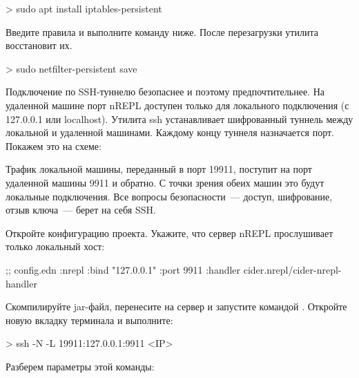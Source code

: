 \begin{english}
  \begin{bash}
> sudo apt install iptables-persistent
  \end{bash}
\end{english}

Введите правила и выполните команду ниже. После перезагрузки утилита восстановит их.

\begin{english}
  \begin{bash}
> sudo netfilter-persistent save
  \end{bash}
\end{english}

Подключение по SSH-туннелю безопаснее и поэтому предпочтительнее. На удаленной машине порт nREPL доступен только для локального подключения (с 127.0.0.1 или localhost). Утилита ssh устанавливает шифрованный туннель между локальной и удаленной машинами. Каждому концу туннеля назначается порт. Покажем это на схеме:

\begin{figure}[H]
  \centering
  
  \label{fig:chart-repl-02}
\end{figure}

Трафик локальной машины, переданный в порт 19911, поступит на порт удаленной машины 9911 и обратно. С точки зрения обеих машин это будут локальные подключения. Все вопросы безопасности~--- доступ, шифрование, отзыв ключа~--- берет на себя SSH.

Откройте конфигурацию проекта. Укажите, что сервер nREPL прослушивает только локальный хост:

\begin{english}
  \begin{clojure}
;; config.edn
{:nrepl
  {:bind "127.0.0.1"
   :port 9911
   :handler cider.nrepl/cider-nrepl-handler}}
  \end{clojure}
\end{english}

Скомпилируйте jar-файл, перенесите на сервер и запустите командой . Откройте новую вкладку терминала и выполните:

\begin{english}
  \begin{bash}
> ssh -N -L 19911:127.0.0.1:9911 <IP>
  \end{bash}
\end{english}

Разберем параметры этой команды:

